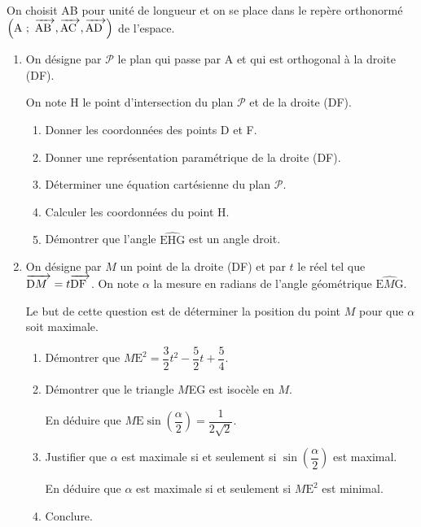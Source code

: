 \documentclass[10pt]{article}
\newcommand{\vect}[1]{\mathchoice%
{\overrightarrow{\displaystyle\mathstrut#1\,\,}}%
{\overrightarrow{\textstyle\mathstrut#1\,\,}}%
{\overrightarrow{\scriptstyle\mathstrut#1\,\,}}%
{\overrightarrow{\scriptscriptstyle\mathstrut#1\,\,}}}
\begin{document}
\medskip{}

On choisit AB pour unité de longueur et on se place dans le repère orthonormé $\left(\text{A}~;~\vect{\text{AB}}, \vect{\text{AC}}, \vect{\text{AD}}\right)$ de l'espace.

\medskip 

\begin{enumerate}
\item On désigne par $\mathcal{P}$ le plan qui passe par A et qui est orthogonal à la droite (DF). 

On note H le point d'intersection du plan $\mathcal{P}$ et de la droite (DF). 
	\begin{enumerate}
		\item Donner les coordonnées des points D et F. 
		\item Donner une représentation paramétrique de la droite (DF). 
		\item Déterminer une équation cartésienne du plan $\mathcal{P}$. 
		\item Calculer les coordonnées du point H. 
		\item Démontrer que l'angle $\widehat{\text{EHG}}$ est un angle droit. 
	\end{enumerate}
\item On désigne par $M$ un point de la droite (DF) et par $t$ le réel tel que $\vect{\text{D}M} = t\vect{\text{DF}}$. On note $\alpha$ la mesure en radians de l'angle géométrique $\widehat{\text{E}M\text{G}}$. 

Le but de cette question est de déterminer la position du point $M$ pour que $\alpha$ soit maximale. 
	\begin{enumerate}
		\item Démontrer que $M\text{E}^2 = \dfrac{3}{2}t^2 - \dfrac{5}{2}t + \dfrac{5}{4}$. 
		\item Démontrer que le triangle $M$EG est isocèle en $M$.
		
		En déduire que $M\text{E}\sin \left(\dfrac{\alpha}{2} \right) = \dfrac{1}{2\sqrt{2}}$. 
		\item Justifier que $\alpha$ est maximale si et seulement si $\sin \left(\dfrac{\alpha}{2} \right)$ est maximal. 

En déduire que $\alpha$ est maximale si et seulement si $M\text{E}^2$ est minimal. 
		\item Conclure. 
	\end{enumerate}
\end{enumerate}
\end{document}
